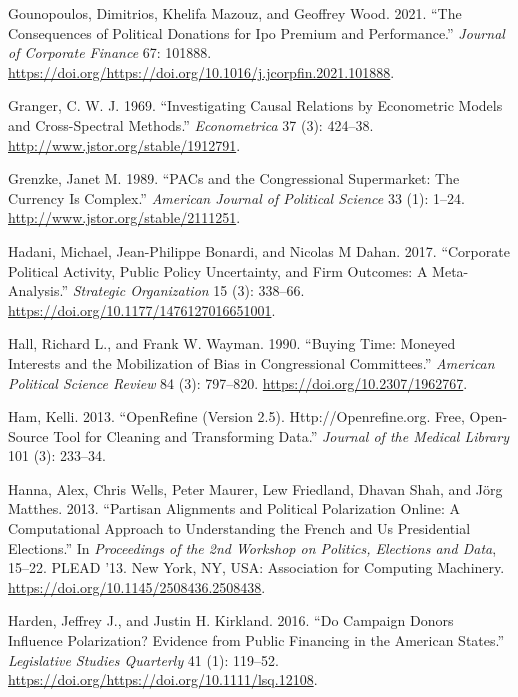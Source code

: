 \documentclass[12pt,]{article}
\begin{document}
\leavevmode\hypertarget{ref-gounopoulos2021}{}%
Gounopoulos, Dimitrios, Khelifa Mazouz, and Geoffrey Wood. 2021. ``The
Consequences of Political Donations for Ipo Premium and Performance.''
\emph{Journal of Corporate Finance} 67: 101888.
\url{https://doi.org/https://doi.org/10.1016/j.jcorpfin.2021.101888}.

\leavevmode\hypertarget{ref-granger}{}%
Granger, C. W. J. 1969. ``Investigating Causal Relations by Econometric
Models and Cross-Spectral Methods.'' \emph{Econometrica} 37 (3):
424--38. \url{http://www.jstor.org/stable/1912791}.

\leavevmode\hypertarget{ref-grenzke1989}{}%
Grenzke, Janet M. 1989. ``PACs and the Congressional Supermarket: The
Currency Is Complex.'' \emph{American Journal of Political Science} 33
(1): 1--24. \url{http://www.jstor.org/stable/2111251}.

\leavevmode\hypertarget{ref-hadani2017}{}%
Hadani, Michael, Jean-Philippe Bonardi, and Nicolas M Dahan. 2017.
``Corporate Political Activity, Public Policy Uncertainty, and Firm
Outcomes: A Meta-Analysis.'' \emph{Strategic Organization} 15 (3):
338--66. \url{https://doi.org/10.1177/1476127016651001}.

\leavevmode\hypertarget{ref-hall1990}{}%
Hall, Richard L., and Frank W. Wayman. 1990. ``Buying Time: Moneyed
Interests and the Mobilization of Bias in Congressional Committees.''
\emph{American Political Science Review} 84 (3): 797--820.
\url{https://doi.org/10.2307/1962767}.

\leavevmode\hypertarget{ref-openrefine}{}%
Ham, Kelli. 2013. ``OpenRefine (Version 2.5). Http://Openrefine.org.
Free, Open-Source Tool for Cleaning and Transforming Data.''
\emph{Journal of the Medical Library} 101 (3): 233--34.

\leavevmode\hypertarget{ref-hanna2013}{}%
Hanna, Alex, Chris Wells, Peter Maurer, Lew Friedland, Dhavan Shah, and
Jörg Matthes. 2013. ``Partisan Alignments and Political Polarization
Online: A Computational Approach to Understanding the French and Us
Presidential Elections.'' In \emph{Proceedings of the 2nd Workshop on
Politics, Elections and Data}, 15--22. PLEAD '13. New York, NY, USA:
Association for Computing Machinery.
\url{https://doi.org/10.1145/2508436.2508438}.

\leavevmode\hypertarget{ref-harden2016}{}%
Harden, Jeffrey J., and Justin H. Kirkland. 2016. ``Do Campaign Donors
Influence Polarization? Evidence from Public Financing in the American
States.'' \emph{Legislative Studies Quarterly} 41 (1): 119--52.
\url{https://doi.org/https://doi.org/10.1111/lsq.12108}.
\end{document}
